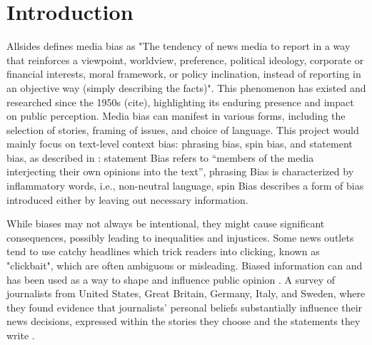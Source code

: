 \chapter{Introduction}
\label{cha:intro}

Allsides \cite{allsides-2022-bias-definition} defines media bias as "The tendency of news media to report in a way that reinforces a viewpoint, worldview, preference, political ideology, corporate or financial interests, moral framework, or policy inclination, instead of reporting in an objective way (simply describing the facts)". This phenomenon has existed and researched since the 1950s (cite), highlighting its enduring presence and impact on public perception. Media bias can manifest in various forms, including the selection of stories, framing of issues, and choice of language. This project would mainly focus on text-level context bias: phrasing bias, spin bias, and statement bias, as described in \cite{spinde-2024-taxonomy}: statement Bias refers to “members of the media interjecting their own opinions into the text”, phrasing Bias is characterized by inflammatory words, i.e., non-neutral language, spin Bias describes a form of bias introduced either by leaving out necessary information.

While biases may not always be intentional, they might cause significant consequences, possibly leading to inequalities and injustices. Some news outlets tend to use catchy headlines which trick readers into clicking, known as "clickbait", which are often ambiguous or misleading. Biased information can and has been used as a way to shape and influence public opinion \cite{aires-2020-information}. A survey of journalists from United States, Great Britain, Germany, Italy, and Sweden, where they found evidence that journalists' personal beliefs substantially influence their news decisions, expressed within the stories they choose and the statements they write \cite{patterson-donsbach-1996-news-decisions}.

